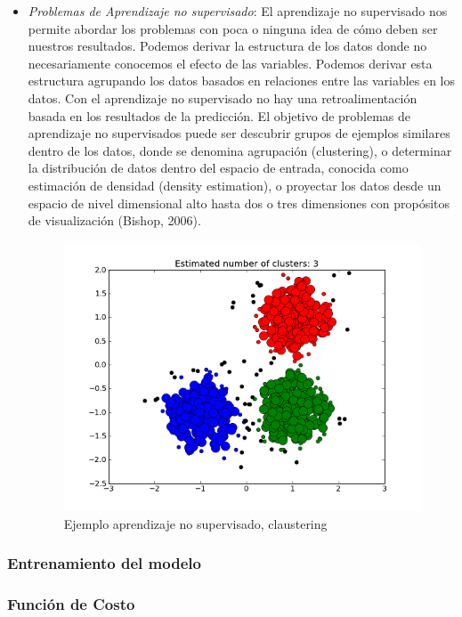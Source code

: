\begin{itemize}
\item \textit{Problemas de Aprendizaje no supervisado}: El aprendizaje no supervisado nos permite abordar los problemas con
poca o ninguna idea de cómo deben ser nuestros resultados. Podemos derivar la estructura de los datos donde no necesariamente conocemos el efecto de las variables. Podemos derivar esta estructura agrupando los datos basados en relaciones entre las variables en los datos. Con el aprendizaje no supervisado no hay una retroalimentación basada en los resultados de la predicción. El objetivo de problemas de aprendizaje no supervisados puede ser descubrir grupos de ejemplos similares dentro de los datos, donde se denomina agrupación (clustering), o determinar la distribución de datos dentro del espacio de entrada, conocida como estimación de densidad (density estimation), o proyectar los datos desde un espacio de nivel dimensional alto hasta dos o tres dimensiones con propósitos de visualización (Bishop, 2006).

\begin{figure}[H] \centering
  \includegraphics[height=8cm,keepaspectratio=true,clip=true]{imagenes/MarcoTeorico/claustering.png}
  \caption{Ejemplo aprendizaje no supervisado, claustering}\label{Fig:clauster}
\end{figure}
\end{itemize}

\subsubsection{Entrenamiento del modelo}


\subsubsection{Función de Costo}

